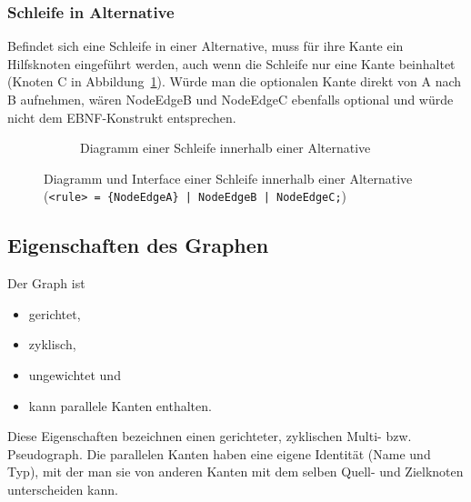 \documentclass[../InterneDSLs.tex]{subfiles}
\begin{document}
\subsubsection{Schleife in Alternative}
Befindet sich eine Schleife in einer Alternative, muss für ihre Kante ein Hilfsknoten eingeführt werden, auch wenn die Schleife nur eine Kante beinhaltet (Knoten C in Abbildung~\ref{FIG:DiagramLoopInAlternative}). Würde man die optionalen Kante direkt von A nach B aufnehmen, wären NodeEdgeB und NodeEdgeC ebenfalls optional und würde nicht dem EBNF-Konstrukt entsprechen.
\begin{figure}[ht]
\centering
  \begin{subfigure}[c]{0.49\textwidth}
    \caption{Diagramm einer Schleife innerhalb einer Alternative}
    \label{FIG:DiagramLoopInAlternative}
  \end{subfigure}
  \begin{subfigure}[c]{0.49\textwidth}
    
  \end{subfigure}
  \caption{Diagramm und Interface einer Schleife innerhalb einer Alternative (\texttt{<rule> = \{NodeEdgeA\} | NodeEdgeB | NodeEdgeC;})}
  \label{FIG:LoopInAlternative}
\end{figure}

\subsection{Eigenschaften des Graphen}
Der Graph ist
\begin{itemize}
	\item gerichtet,
	\item zyklisch,
	\item ungewichtet und
	\item kann parallele Kanten enthalten.
\end{itemize}
Diese Eigenschaften bezeichnen einen gerichteter, zyklischen Multi- bzw. Pseudograph. Die parallelen Kanten haben eine eigene Identität (Name und Typ), mit der man sie von anderen Kanten mit dem selben Quell- und Zielknoten unterscheiden kann.
\end{document}
